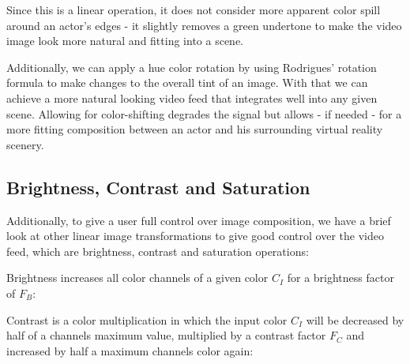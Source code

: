 

Since this is a linear operation, it does not consider more apparent color 
spill around an actor's edges - it slightly removes a green undertone to make 
the video image look more natural and fitting into a scene.

Additionally, we can apply a hue color rotation by using Rodrigues' rotation 
formula to make changes to the overall tint of an 
image\cite{shagam:hsv-rotation}. With that we can achieve a more natural 
looking video feed that integrates well into any given scene. Allowing for 
color-shifting degrades the signal but allows - if needed - for a more fitting 
composition between an actor and his surrounding virtual reality scenery.

\subsection{Brightness, Contrast and Saturation}

Additionally, to give a user full control over image composition, we have a 
brief look at other linear image transformations to give good control over the 
video feed, which are brightness, contrast and saturation operations:

Brightness increases all color channels of a given color $C_I$ for a brightness 
factor of $F_B$:


Contrast is a color multiplication in which the input color $C_I$ will be 
decreased by half of a channels maximum value, multiplied by a contrast factor 
$F_C$ and increased by half a maximum channels color again:

